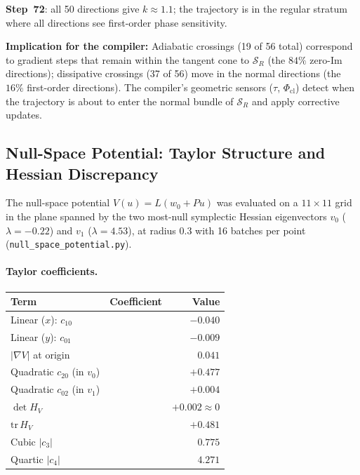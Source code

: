 \documentclass[11pt]{amsart}
\begin{document}
\textbf{Step~72}: all 50 directions give $k \approx 1.1$;
the trajectory is in the regular stratum where all directions see
first-order phase sensitivity.

\textbf{Implication for the compiler:}
Adiabatic crossings (19 of 56 total) correspond to gradient steps
that remain within the tangent cone to $\mathcal{S}_R$
(the $84\%$ zero-Im directions);
dissipative crossings (37 of 56) move in the normal directions
(the $16\%$ first-order directions).
The compiler's geometric sensors ($\tau$, $\Phi_\mathrm{cl}$)
detect when the trajectory is about to enter the normal bundle of
$\mathcal{S}_R$ and apply corrective updates.

\subsection{Null-Space Potential: Taylor Structure and Hessian Discrepancy}
\label{sec:null_potential}

The null-space potential $V(u) = L(w_0 + Pu)$ was evaluated on a
$11\times11$ grid in the plane spanned by the two most-null symplectic
Hessian eigenvectors $v_0$ ($\lambda=-0.22$) and $v_1$ ($\lambda=4.53$),
at radius $0.3$ with 16 batches per point
(\texttt{null\_space\_potential.py}).

\paragraph{Taylor coefficients.}

\begin{center}
\small
\begin{tabular}{@{}llr@{}}
\toprule
Term & Coefficient & Value \\
\midrule
Linear ($x$): $c_{10}$ & & $-0.040$ \\
Linear ($y$): $c_{01}$ & & $-0.009$ \\
$|\nabla V|$ at origin & & $0.041$ \\
Quadratic $c_{20}$ (in $v_0$) & & $+0.477$ \\
Quadratic $c_{02}$ (in $v_1$) & & $+0.004$ \\
$\det H_V$ & & $+0.002 \approx 0$ \\
$\mathrm{tr}\, H_V$ & & $+0.481$ \\
Cubic $|c_3|$ & & $0.775$ \\
Quartic $|c_4|$ & & $4.271$ \\
\bottomrule
\end{tabular}
\end{center}
\end{document}
